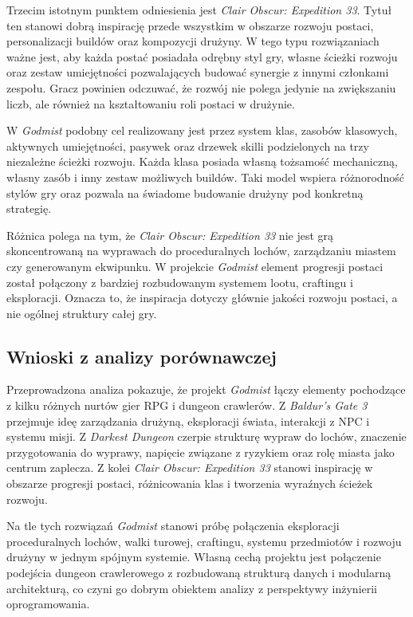 Trzecim istotnym punktem odniesienia jest \emph{Clair Obscur: Expedition 33}. Tytuł ten stanowi dobrą inspirację przede wszystkim w obszarze rozwoju postaci, personalizacji buildów oraz kompozycji drużyny. W tego typu rozwiązaniach ważne jest, aby każda postać posiadała odrębny styl gry, własne ścieżki rozwoju oraz zestaw umiejętności pozwalających budować synergie z innymi członkami zespołu. Gracz powinien odczuwać, że rozwój nie polega jedynie na zwiększaniu liczb, ale również na kształtowaniu roli postaci w drużynie.

W \emph{Godmist} podobny cel realizowany jest przez system klas, zasobów klasowych, aktywnych umiejętności, pasywek oraz drzewek skilli podzielonych na trzy niezależne ścieżki rozwoju. Każda klasa posiada własną tożsamość mechaniczną, własny zasób i inny zestaw możliwych buildów. Taki model wspiera różnorodność stylów gry oraz pozwala na świadome budowanie drużyny pod konkretną strategię.

Różnica polega na tym, że \emph{Clair Obscur: Expedition 33} nie jest grą skoncentrowaną na wyprawach do proceduralnych lochów, zarządzaniu miastem czy generowanym ekwipunku. W projekcie \emph{Godmist} element progresji postaci został połączony z bardziej rozbudowanym systemem lootu, craftingu i eksploracji. Oznacza to, że inspiracja dotyczy głównie jakości rozwoju postaci, a nie ogólnej struktury całej gry.

\subsection{Wnioski z analizy porównawczej}
\label{subsec:wnioski-z-analizy}

Przeprowadzona analiza pokazuje, że projekt \emph{Godmist} łączy elementy pochodzące z kilku różnych nurtów gier RPG i dungeon crawlerów. Z \emph{Baldur's Gate 3} przejmuje ideę zarządzania drużyną, eksploracji świata, interakcji z NPC i systemu misji. Z \emph{Darkest Dungeon} czerpie strukturę wypraw do lochów, znaczenie przygotowania do wyprawy, napięcie związane z ryzykiem oraz rolę miasta jako centrum zaplecza. Z kolei \emph{Clair Obscur: Expedition 33} stanowi inspirację w obszarze progresji postaci, różnicowania klas i tworzenia wyraźnych ścieżek rozwoju.

Na tle tych rozwiązań \emph{Godmist} stanowi próbę połączenia eksploracji proceduralnych lochów, walki turowej, craftingu, systemu przedmiotów i rozwoju drużyny w jednym spójnym systemie. Własną cechą projektu jest połączenie podejścia dungeon crawlerowego z rozbudowaną strukturą danych i modularną architekturą, co czyni go dobrym obiektem analizy z perspektywy inżynierii oprogramowania.

